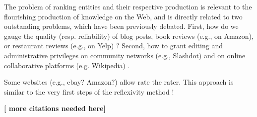 %
%
%

The problem of ranking entities and their respective production is relevant to the 
flourishing production of knowledge on the Web, and is directly related to two outstanding problems, which have been previously debated. First, how do we gauge the quality (resp. reliability) of blog posts, book reviews (e.g., on Amazon), or restaurant reviews (e.g., on Yelp) ?  Second,  how to grant editing and administrative privileges on community networks (e.g., Slashdot) and on online collaborative platforms (e.g. Wikipedia) \cite{halfaker2013}. 

Some websites (e.g., ebay? Amazon?) allow rate the rater. This approach is similar to the very first steps of the reflexivity method ! \cite{citation needed.}

{\bf [ more citations needed here]}





